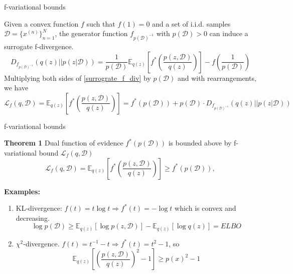 \documentclass{beamer}
\begin{document}
\begin{frame}{f-variational bounds}
    \begin{block}{}
        Given a convex function $f$ such that $f(1) = 0$ and a set of i.i.d. samples $\mathcal{D}=\{x^{(n)}\}_{n=1}^N$, the generator function $f_{p(\mathcal{D})^{-1}}$ with $p(\mathcal{D}) > 0$ can induce a surrogate f-divergence.
        \begin{equation}\label{surrograte_f_div}
            D_{f_{p(\mathcal{D})^{-1}}}(q(z)||p(z|\mathcal{D})) = \dfrac{1}{p(\mathcal{D})}\mathbb{E}_{q(z)}\left[f^*\left(\dfrac{p(z, \mathcal{D})}{q(z)}\right)\right] - f\left(\dfrac{1}{p(\mathcal{D})}\right)
        \end{equation}
        Multiplying both sides of \eqref{surrograte_f_div} by $p(\mathcal{D})$ and with rearrangements, we have
        \begin{equation}\label{L_f}
            \mathcal{L}_f(q, \mathcal{D}) = \mathbb{E}_{q(z)}\left[f^*\left(\dfrac{p(z, \mathcal{D})}{q(z)}\right)\right] = f^*(p(\mathcal{D})) + p(\mathcal{D})\cdot D_{f_{p(\mathcal{D})^{-1}}}(q(z)||p(z|\mathcal{D}))
        \end{equation}
    \end{block}
\end{frame}

\begin{frame}{f-variational bounds}
    \begin{block}{}
        \textbf{Theorem 1} Dual function of evidence $f^*(p(\mathcal{D}))$  is bounded above by f-variational bound $\mathcal{L}_f(q, \mathcal{D})$
        \begin{equation}\label{theo1}
            \mathcal{L}_f(q, \mathcal{D}) = \mathbb{E}_{q(z)}\left[f^*\left(\dfrac{p(z, \mathcal{D})}{q(z)}\right)\right] \geqslant f^*(p(\mathcal{D})),
        \end{equation}

        \textbf{Examples:}
        \begin{enumerate}
            \item KL-divergence: $f(t) = t\log t \Rightarrow f^*(t) = -\log t$ which is convex and decreasing. 
            $$\log p(\mathcal{D}) \geqslant \mathbb{E}_{q(z)}[\log p(z, \mathcal{D})] - \mathbb{E}_{q(z)}[\log q(z)] = ELBO$$
            \item $\chi^2$-divergence. $f(t) = t^{-1} - t \Rightarrow f^*(t) = t^2 - 1$, so
            $$\mathbb{E}_{q(z)}\left[\left(\dfrac{p(z, \mathcal{D})}{q(z)}\right)^2 - 1\right] \geqslant p(x)^2 - 1$$
            
        \end{enumerate}
    \end{block}
\end{frame}
\end{document}
